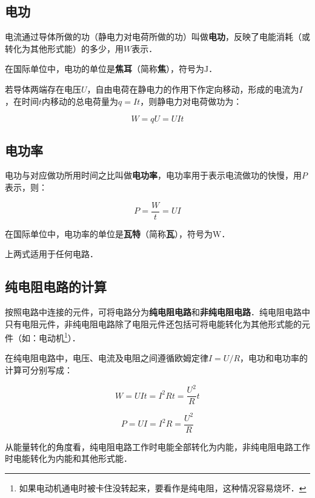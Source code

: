 
\subsection{电功}

电流通过导体所做的功（静电力对电荷所做的功）叫做\textbf{电功}，反映了电能消耗（或转化为其他形式能）的多少，用$W$表示．

在国际单位中，电功的单位是\textbf{焦耳}（简称\textbf{焦}），符号为$\mathrm{J}$．

若导体两端存在电压$U$，自由电荷在静电力的作用下作定向移动，形成的电流为$I$，在时间$t$内移动的总电荷量为$q=It$，则静电力对电荷做功为：

\begin{equation}
W=qU=UIt
\end{equation}

\subsection{电功率}

电功与对应做功所用时间之比叫做\textbf{电功率}，电功率用于表示电流做功的快慢，用$P$表示，则：

\begin{equation}
P=\frac{W}{t}=UI
\end{equation}

在国际单位中，电功率的单位是\textbf{瓦特}（简称\textbf{瓦}），符号为$\mathrm{W}$．

上两式适用于任何电路．

\subsection{纯电阻电路的计算}

按照电路中连接的元件，可将电路分为\textbf{纯电阻电路}和\textbf{非纯电阻电路}．纯电阻电路中只有电阻元件，非纯电阻电路除了电阻元件还包括可将电能转化为其他形式能的元件（如：电动机\footnote{如果电动机通电时被卡住没转起来，要看作是纯电阻，这种情况容易烧坏．}）．

在纯电阻电路中，电压、电流及电阻之间遵循欧姆定律$I=U/R$，电功和电功率的计算可分别写成：

\begin{equation}
W=UIt=I^2 Rt=\frac{U^2}{R}t
\end{equation}

\begin{equation}
P=UI=I^2 R=\frac{U^2}{R}
\end{equation}

从能量转化的角度看，纯电阻电路工作时电能全部转化为内能，非纯电阻电路工作时电能转化为内能和其他形式能．
